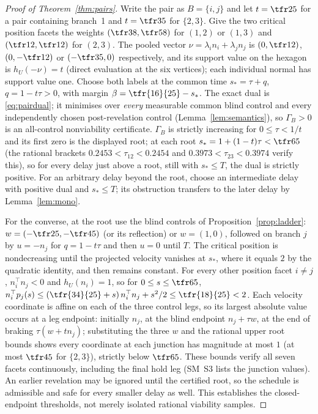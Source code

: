 \begin{proof}[Proof of Theorem~\ref{thm:pairs}]
Write the pair as $B=\{i,j\}$ and let $t=\tfr25$ for a pair containing branch~1 and $t=\tfr35$ for $\{2,3\}$. Give the two critical position facets the weights $(\tfr38,\tfr58)$ for $(1,2)$ or $(1,3)$ and $(\tfr12,\tfr12)$ for $(2,3)$. The pooled vector $\nu=\lambda_in_i+\lambda_jn_j$ is $(0,\tfr12)$, $(0,-\tfr12)$ or $(-\tfr35,0)$ respectively, and its support value on the hexagon is $h_U(-\nu)=t$ (direct evaluation at the six vertices); each individual normal has support value one. Choose both labels at the common time $s_\ast=\tau+q$, $q=1-t\tau>0$, with margin $\beta=\tfr{16}{25}-s_\ast$. The exact dual is \eqref{eq:pairdual}; it minimises over \emph{every} measurable common blind control and every independently chosen post-revelation control (Lemma~\ref{lem:semantics}), so $\Gamma_B>0$ is an all-control nonviability certificate. $\Gamma_B$ is strictly increasing for $0\le\tau<1/t$ and its first zero is the displayed root; at each root $s_\ast=1+(1-t)\tau<\tfr65$ (the rational brackets $0.2453<\tau_{12}<0.2454$ and $0.3973<\tau_{23}<0.3974$ verify this), so for every delay just above a root, still with $s_\ast\le T$, the dual is strictly positive. For an arbitrary delay beyond the root, choose an intermediate delay with positive dual and $s_\ast\le T$; its obstruction transfers to the later delay by Lemma~\ref{lem:mono}.

For the converse, at the root use the blind controls of Proposition~\ref{prop:ladder}: $w=(-\tfr25,-\tfr45)$ (or its reflection) or $w=(1,0)$, followed on branch $j$ by $u=-n_j$ for $q=1-t\tau$ and then $u=0$ until $T$. The critical position is nondecreasing until the projected velocity vanishes at $s_\ast$, where it equals $2$ by the quadratic identity, and then remains constant. For every other position facet $i\ne j$, $n_i^\top n_j<0$ and $h_U(n_i)=1$, so for $0\le s\le\tfr65$, $n_i^\top p_j(s)\le(\tfr{34}{25}+s)\,n_i^\top n_j+s^2/2\le\tfr{18}{25}<2$. Each velocity coordinate is affine on each of the three control legs, so its largest absolute value occurs at a leg endpoint: initially $n_j$, at the blind endpoint $n_j+\tau w$, at the end of braking $\tau(w+tn_j)$; substituting the three $w$ and the rational upper root bounds shows every coordinate at each junction has magnitude at most $1$ (at most $\tfr45$ for $\{2,3\}$), strictly below $\tfr65$. These bounds verify all seven facets continuously, including the final hold leg (SM~S3 lists the junction values). An earlier revelation may be ignored until the certified root, so the schedule is admissible and safe for every smaller delay as well. This establishes the closed-endpoint thresholds, not merely isolated rational viability samples.
\end{proof}
